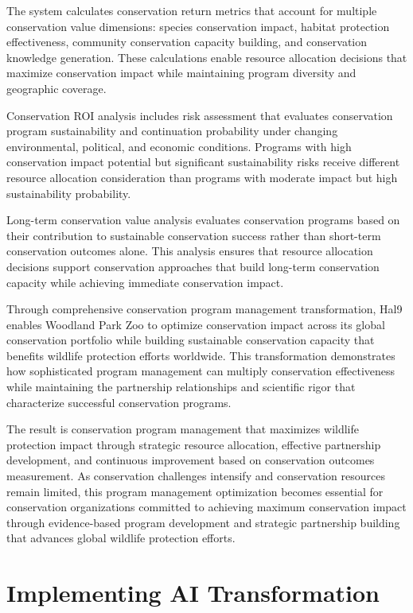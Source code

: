 \documentclass[
  Letterpaper,
]{scrbook}
\begin{document}
The system calculates conservation return metrics that account for
multiple conservation value dimensions: species conservation impact,
habitat protection effectiveness, community conservation capacity
building, and conservation knowledge generation. These calculations
enable resource allocation decisions that maximize conservation impact
while maintaining program diversity and geographic coverage.

Conservation ROI analysis includes risk assessment that evaluates
conservation program sustainability and continuation probability under
changing environmental, political, and economic conditions. Programs
with high conservation impact potential but significant sustainability
risks receive different resource allocation consideration than programs
with moderate impact but high sustainability probability.

Long-term conservation value analysis evaluates conservation programs
based on their contribution to sustainable conservation success rather
than short-term conservation outcomes alone. This analysis ensures that
resource allocation decisions support conservation approaches that build
long-term conservation capacity while achieving immediate conservation
impact.

Through comprehensive conservation program management transformation,
Hal9 enables Woodland Park Zoo to optimize conservation impact across
its global conservation portfolio while building sustainable
conservation capacity that benefits wildlife protection efforts
worldwide. This transformation demonstrates how sophisticated program
management can multiply conservation effectiveness while maintaining the
partnership relationships and scientific rigor that characterize
successful conservation programs.

The result is conservation program management that maximizes wildlife
protection impact through strategic resource allocation, effective
partnership development, and continuous improvement based on
conservation outcomes measurement. As conservation challenges intensify
and conservation resources remain limited, this program management
optimization becomes essential for conservation organizations committed
to achieving maximum conservation impact through evidence-based program
development and strategic partnership building that advances global
wildlife protection efforts.


\chapter{Implementing AI
Transformation}\label{implementing-ai-transformation}
\end{document}
